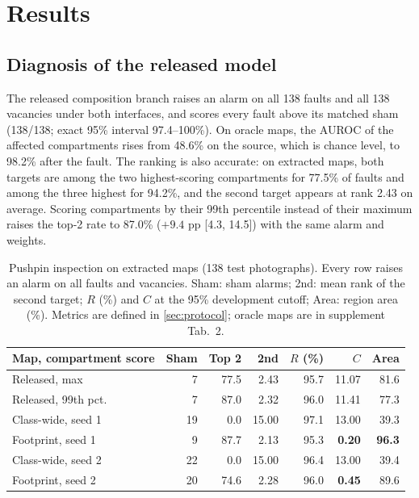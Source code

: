 \documentclass[10pt,twocolumn,letterpaper]{article}
\begin{document}
\section{Results}
\label{sec:results}
\subsection{Diagnosis of the released model}
\label{sec:released}
The released composition branch raises an alarm on all 138 faults and all 138 vacancies under both interfaces, and scores every fault above its matched sham (138/138; exact 95\% interval 97.4--100\%). On oracle maps, the AUROC of the affected compartments rises from 48.6\% on the source, which is chance level, to 98.2\% after the fault. The ranking is also accurate: on extracted maps, both targets are among the two highest-scoring compartments for 77.5\% of faults and among the three highest for 94.2\%, and the second target appears at rank 2.43 on average. Scoring compartments by their 99th percentile instead of their maximum raises the top-2 rate to 87.0\% ($+9.4$ pp [4.3, 14.5]) with the same alarm and weights.

\begin{table}[t]
\centering
\caption{Pushpin inspection on extracted maps (138 test photographs). Every row raises an alarm on all faults and vacancies. Sham: sham alarms; 2nd: mean rank of the second target; $R$ (\%) and $C$ at the 95\% development cutoff; Area: region area (\%). Metrics are defined in \cref{sec:protocol}; oracle maps are in supplement Tab.~2.}
\label{tab:inspection}
\footnotesize
\setlength{\tabcolsep}{3.2pt}
\begin{tabular}{@{}lrrrrrr@{}}
\toprule
Map, compartment score & Sham & Top 2 & 2nd & $R$ (\%) & $C$ & Area \\
\midrule
Released, max          & 7  & 77.5 & 2.43  & 95.7 & 11.07 & 81.6 \\
Released, 99th pct.    & 7  & 87.0 & 2.32  & 96.0 & 11.41 & 77.3 \\
\midrule
Class-wide, seed 1     & 19 & 0.0  & 15.00 & 97.1 & 13.00 & 39.3 \\
Footprint, seed 1      & 9  & 87.7 & 2.13  & 95.3 & \textbf{0.20} & \textbf{96.3} \\
\midrule
Class-wide, seed 2     & 22 & 0.0  & 15.00 & 96.4 & 13.00 & 39.4 \\
Footprint, seed 2      & 20 & 74.6 & 2.28  & 96.0 & \textbf{0.45} & 89.6 \\
\bottomrule
\end{tabular}
\end{table}
\end{document}
